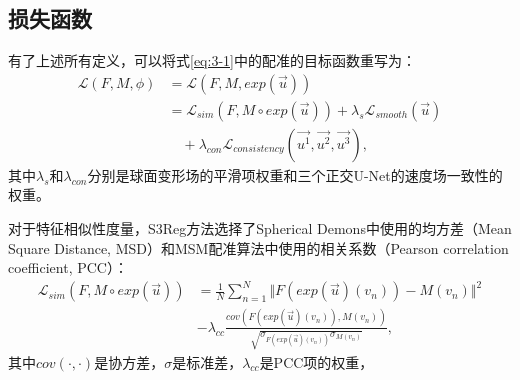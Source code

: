 \subsection{损失函数}\label{sec:s3reg配准网络的损失函数}
有了上述所有定义，可以将式\ref{eq:3-1}中的配准的目标函数重写为：
\begin{equation}
\begin{split}
{\mathcal{L}}(F,M,\phi) & = {\mathcal{L}}(F,M,exp(\overrightarrow{u})) \\
& = {\mathcal{L}}_{sim}(F,M\circ exp(\overrightarrow{u})) + \lambda_s {\mathcal{L}}_{smooth}(\overrightarrow{u}) \\
& \quad + \lambda_{con} {\mathcal{L}}_{consistency}(\overrightarrow{u^1}, \overrightarrow{u^2}, \overrightarrow{u^3}),
\end{split}
\end{equation}
其中$\lambda_s$和$\lambda_{con}$分别是球面变形场的平滑项权重和三个正交U-Net的速度场一致性的权重。

对于特征相似性度量，S3Reg方法选择了Spherical Demons中使用的均方差（Mean Square Distance, MSD）\cite{yeo2009spherical}和MSM配准算法\cite{robinson2014msm}中使用的相关系数（Pearson correlation coefficient, PCC）：
\begin{equation}
	\begin{split}
	{\mathcal{L}}_{sim}(F,M\circ exp(\overrightarrow{u})) & = \frac{1}{N} \sum_{n=1}^{N} \Vert F(exp(\overrightarrow{u})(v_n)) - M(v_n) \Vert ^2 \\
	& - \lambda_{cc} \frac{cov(F(exp(\overrightarrow{u})(v_n)), M(v_n))}{\sqrt{\sigma_{ F(exp(\overrightarrow{u})(v_n))} \sigma_{M(v_n)}}} , 
	\end{split}
\end{equation}
其中$cov(\cdot,\cdot)$是协方差，$\sigma$是标准差，$\lambda_{cc}$是PCC项的权重，

